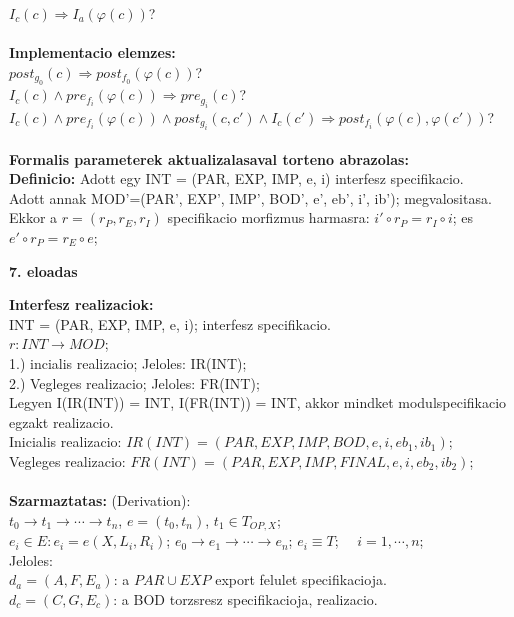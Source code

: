 \documentclass[a4paper,10pt]{article}
\begin{document}
$I_c(c) \Rightarrow I_a(\varphi(c))$?\\ \\
\textbf{Implementacio elemzes:}\\
$post_{g_0}(c) \Rightarrow post_{f_0}(\varphi(c))$?\\
$I_c(c) \wedge pre_{f_i}(\varphi(c)) \Rightarrow pre_{g_i}(c)$?\\
$I_c(c) \wedge pre_{f_i}(\varphi(c)) \wedge post_{g_i}(c,c') \wedge I_c(c') \Rightarrow post_{f_i}(\varphi(c), \varphi(c'))$?\\ \\
\textbf{Formalis parameterek aktualizalasaval torteno abrazolas:}\\
\textbf{Definicio:} Adott egy INT = (PAR, EXP, IMP, e, i) interfesz specifikacio.\\
Adott annak MOD'=(PAR', EXP', IMP', BOD', e', eb', i', ib'); megvalositasa.\\
Ekkor a $r=(r_P, r_E, r_I)$ specifikacio morfizmus harmasra: $i' \circ r_P = r_I \circ i$; es $e' \circ r_P = r_E \circ e$;
\newpage
%
%
\begin{flushleft}
\textbf{7. eloadas}
\end{flushleft}
\textbf{Interfesz realizaciok:}\\
INT = (PAR, EXP, IMP, e, i); interfesz specifikacio.\\
$r: INT \to MOD$;\\
1.) incialis realizacio; Jeloles: IR(INT);\\
2.) Vegleges realizacio; Jeloles: FR(INT);\\
Legyen I(IR(INT)) = INT, I(FR(INT)) = INT, akkor mindket modulspecifikacio egzakt realizacio.\\
Inicialis realizacio: $IR(INT) = (PAR, EXP, IMP, BOD, e, i, eb_1, ib_1)$;\\
Vegleges realizacio: $FR(INT) = (PAR, EXP, IMP, FINAL, e, i, eb_2, ib_2)$;\\\\
\textbf{Szarmaztatas:} (Derivation):\\ 
$t_0\to t_1 \to \cdots\to t_n$, $e=(t_0,t_n)$, $t_1\in T_{OP, X}$;\\
$e_i\in E:e_i=e(X, L_i, R_i)$; $e_0\to e_1\to \cdots\to e_n$; $e_i\equiv T$; $\quad i=1,\cdots,n$;\\
Jeloles:\\
$d_a=(A, F, E_a)$: a $PAR \cup EXP$ export felulet specifikacioja.\\
$d_c=(C, G, E_c)$: a BOD torzsresz specifikacioja, realizacio.\\
\end{document}
